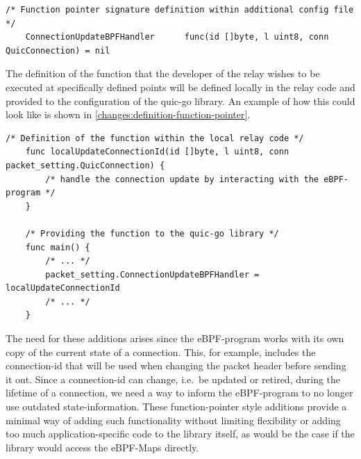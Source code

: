 \vspace{0.5cm}
\noindent\begin{minipage}{\textwidth}
\begin{lstlisting}[style=GoStyle, label=changes:signature-function-pointer, caption=Only the signature will be defined within the library itself.]
    /* Function pointer signature definition within additional config file */
	ConnectionUpdateBPFHandler      func(id []byte, l uint8, conn QuicConnection) = nil
\end{lstlisting}
\end{minipage}

The definition of the function that the developer of the relay wishes to be executed at specifically
defined points will be defined locally in the relay code and provided to the configuration of the quic-go library.
An example of how this could look like is shown in \autoref{changes:definition-function-pointer}.

\vspace{0.5cm}
\noindent\begin{minipage}{\textwidth}
\begin{lstlisting}[style=GoStyle, label=changes:definition-function-pointer, caption=An example of how the addition looks on the relay side.]
    /* Definition of the function within the local relay code */
    func localUpdateConnectionId(id []byte, l uint8, conn packet_setting.QuicConnection) {
        /* handle the connection update by interacting with the eBPF-program */
    }   

    /* Providing the function to the quic-go library */
    func main() {
        /* ... */
        packet_setting.ConnectionUpdateBPFHandler = localUpdateConnectionId
        /* ... */
    }
\end{lstlisting}
\end{minipage}

The need for these additions arises since the eBPF-program works with its own copy of the current state of a connection.
This, for example, includes the connection-id that will be used when changing the packet header before sending it out.
Since a connection-id can change, i.e.~be updated or retired, during the lifetime of a connection, we need a way to inform 
the eBPF-program to no longer use outdated state-information.
These function-pointer style additions provide a minimal way of adding such functionality without limiting flexibility 
or adding too much application-specific code to the library itself, as would be the case if the library would access 
the eBPF-Maps directly.

